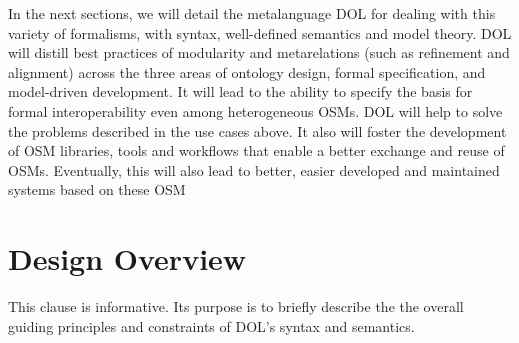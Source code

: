 \documentclass[10pt,%
\ifpretendfinal
final%
\else
draft%
\fi,
]{scrreprt}
\makeatletter
\newcommand*\CommentAuthor{}
\renewcommand*\CommentAuthor{#1}}
\newcommand*\CommentDate{}
\renewcommand*\CommentDate{#1}}
\newcommand*\CommentId{}
\renewcommand*\CommentId{#1}}
\newcommand*\CommentType{}
\renewcommand*\CommentType{#1}}
\newcommand*{\SetCommentColorByType}[1]{%
\edef\localType{{#1}}%
\expandafter\ifstrequal\localType{q-aut}{\colorlet{CommentColor}{red}}{%
\expandafter\ifstrequal\localType{q-all}{\colorlet{CommentColor}{orange}}{%
\expandafter\ifstrequal\localType{todo}{\colorlet{CommentColor}{orange}}{%
\expandafter\ifstrequal\localType{fyi}{\colorlet{CommentColor}{lightgray}}{%
\colorlet{CommentColor}{yellow}}}}}}
\newcommand*{\SetCommentPrefixByType}[1]{%
\edef\localType{{#1}}%
\expandafter\@ifmtarg\localType{%
\edef\CommentPrefix{}%
}{%
\caseupper[q]{#1}%
\edef\CommentPrefix{\thestring: }%
}}
\newcommand*{\initComment}[1]{%
\setkeys{Comment}{#1}%
\SetCommentColorByType{\CommentType}%
\relax%
\SetCommentPrefixByType{\CommentType}%
\relax%
}
\newcommand*{\todonote}[2][]{%
\initComment{#1}%
\pdfcomment[author=\CommentAuthor,color=CommentColor,date=\CommentDate,id=\CommentId]{%
\CommentPrefix
#2}}
\renewcommand*{\todonote}[2][]{%
\initComment{#1}%
\ednote{\CommentPrefix #2}}
\newcommand*{\CLnote}[2][author=Christoph Lange]{%
\todonote[author=Christoph Lange,#1]{#2} 
}
\newcommand*{\shall}{\textbf{shall}\xspace}
\newcommand*{\should}{\textbf{should}\xspace}
\makeatother
\begin{document}
In the next sections, we will detail the metalanguage DOL for dealing with this variety of formalisms, with syntax, well-defined semantics and model theory. DOL 
 will distill best practices of modularity and metarelations (such as refinement and alignment) across the three areas of ontology design, formal 
specification, and model-driven development. It will lead to the ability to specify the basis for formal interoperability even among heterogeneous OSMs. DOL will help to solve the problems described in the use cases above. It also will foster the development of OSM libraries, tools and workflows that 
enable a better exchange and reuse of OSMs. Eventually, this will also lead to better, easier developed and maintained systems based on these OSM


\chapter{Design Overview}
%
%
%
%
This clause is informative. Its purpose is to briefly describe the 
the overall guiding principles and constraints of DOL's syntax and semantics.
%
%
%
%
%
%
\end{document}
